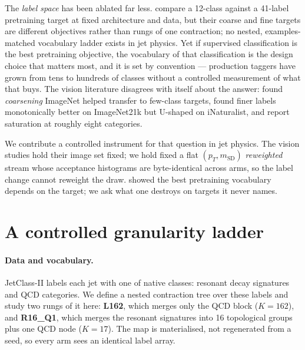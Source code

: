 \documentclass{article}
\begin{document}
The \emph{label space} has been ablated far less. \citet{pecm} compare a
12-class against a 41-label pretraining target at fixed architecture and data,
but their coarse and fine targets are different objectives rather than rungs of
one contraction; no nested, examples-matched vocabulary ladder exists in jet
physics. Yet if supervised classification is the best pretraining objective, the
vocabulary of that classification is the design choice that matters most, and it
is set by convention --- production taggers have grown from tens to hundreds of
classes without a controlled measurement of what that buys. The vision
literature disagrees with itself about the answer: \citet{huh} found \emph{coarsening}
ImageNet helped transfer to few-class targets, \citet{hong} found finer labels
monotonically better on ImageNet21k but U-shaped on iNaturalist, and
\citet{mehta} report saturation at roughly eight categories.

We contribute a controlled instrument for that question in jet physics. The
vision studies hold their image set fixed; we hold fixed a flat
$(p_T, m_\mathrm{SD})$ \emph{reweighted} stream whose acceptance histograms are
byte-identical across arms, so the label change cannot reweight the draw.
\citet{mahajan} showed the best pretraining vocabulary depends on the target; we
ask what one destroys on targets it never names.

\section{A controlled granularity ladder}

\paragraph{Data and vocabulary.} JetClass-II \citep{sophon} labels each jet with one of
\Nnative{} native classes: \Nresonant{} resonant decay signatures and \Nqcd{}
QCD categories. We define a nested contraction tree over these labels and study
two rungs of it here: \textbf{L162}, which merges only the QCD block
($K=162$), and \textbf{R16\_Q1}, which merges the resonant signatures into
16 topological groups plus one QCD node ($K=17$). The map is materialised, not
regenerated from a seed, so every arm sees an identical label array.
\end{document}
